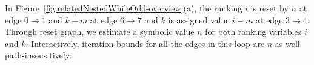 In Figure~\ref{fig:relatedNestedWhileOdd-overview}(a), the ranking $i$ is reset by $n$ at edge $0 \to 1$ and 
$k + m$ at edge $6 \to 7$ and $k$ is assigned value $i - m$ at edge $3 \to 4$. Through reset graph, 
we estimate a symbolic value $n$ for both ranking variables $i$ and $k$.
Interactively, iteration bounds for all the edges in this loop are $n$ as well path-insensitively.
